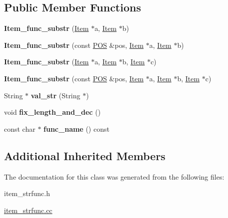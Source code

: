 \subsection*{Public Member Functions}
\begin{DoxyCompactItemize}
\item 
\mbox{\label{classItem__func__substr_a2ba497419a28e513a84a1b6fd1d5d840}} 
{\bfseries Item\+\_\+func\+\_\+substr} (\mbox{\hyperlink{classItem}{Item}} $\ast$a, \mbox{\hyperlink{classItem}{Item}} $\ast$b)
\item 
\mbox{\label{classItem__func__substr_a4eac2c5984e75b83506edc21d56af1a3}} 
{\bfseries Item\+\_\+func\+\_\+substr} (const \mbox{\hyperlink{structYYLTYPE}{P\+OS}} \&pos, \mbox{\hyperlink{classItem}{Item}} $\ast$a, \mbox{\hyperlink{classItem}{Item}} $\ast$b)
\item 
\mbox{\label{classItem__func__substr_a2bc5df6f54a4a0cf6ddf5d4f2ca3d986}} 
{\bfseries Item\+\_\+func\+\_\+substr} (\mbox{\hyperlink{classItem}{Item}} $\ast$a, \mbox{\hyperlink{classItem}{Item}} $\ast$b, \mbox{\hyperlink{classItem}{Item}} $\ast$c)
\item 
\mbox{\label{classItem__func__substr_aeec10abc655c90e62153dc871ec3dcf8}} 
{\bfseries Item\+\_\+func\+\_\+substr} (const \mbox{\hyperlink{structYYLTYPE}{P\+OS}} \&pos, \mbox{\hyperlink{classItem}{Item}} $\ast$a, \mbox{\hyperlink{classItem}{Item}} $\ast$b, \mbox{\hyperlink{classItem}{Item}} $\ast$c)
\item 
\mbox{\label{classItem__func__substr_ad851f71363b8eb7779054cdfb090d58e}} 
String $\ast$ {\bfseries val\+\_\+str} (String $\ast$)
\item 
\mbox{\label{classItem__func__substr_a0c1fa1f0a77ce77ea8682787f570505f}} 
void {\bfseries fix\+\_\+length\+\_\+and\+\_\+dec} ()
\item 
\mbox{\label{classItem__func__substr_ab497a4f58275b6bb2b2042238c666ff3}} 
const char $\ast$ {\bfseries func\+\_\+name} () const
\end{DoxyCompactItemize}
\subsection*{Additional Inherited Members}


The documentation for this class was generated from the following files\+:\begin{DoxyCompactItemize}
\item 
item\+\_\+strfunc.\+h\item 
\mbox{\hyperlink{item__strfunc_8cc}{item\+\_\+strfunc.\+cc}}\end{DoxyCompactItemize}
